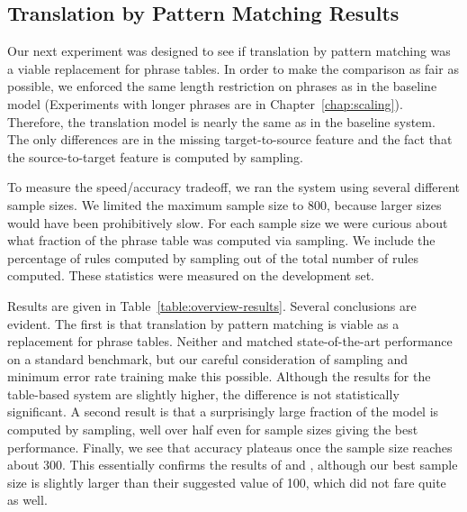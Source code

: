 \subsection{Translation by Pattern Matching Results}

Our next experiment was designed to see if translation by 
pattern matching was a viable replacement for
phrase tables.  In order to make the comparison as fair as
possible, we enforced the same length restriction on phrases
as in the baseline model (Experiments with longer phrases
are in Chapter~\ref{chap:scaling}).  Therefore, the translation
model is nearly the same as in the baseline system.  The only
differences are in the missing target-to-source feature and
the fact that the source-to-target feature is computed by
sampling.

To measure the speed/accuracy tradeoff, we ran the system using
several different sample sizes.  We limited the maximum sample 
size to 800, because larger sizes would have been prohibitively
slow.  For each sample size we were curious
about what fraction of the phrase table was computed
via sampling.  We include the percentage of rules computed by
sampling out of the total number of rules computed.  
These statistics were measured on the development set.

Results are given in Table~\ref{table:overview-results}.  Several 
conclusions are evident.  The first is that translation by pattern 
matching is viable as a replacement for phrase tables. 
Neither \citet{Callison-Burch:2005:acl} and \citet{Zhang:2005:eamt}
matched state-of-the-art performance on a standard benchmark, but our
careful consideration of sampling and minimum error rate training make this possible.
Although the results for the table-based system are slightly higher,
the difference is not statistically significant.  A second result
is that a surprisingly large fraction of the model is computed
by sampling, well over half even for sample sizes giving the best
performance.  Finally, we see that accuracy plateaus once
the sample size reaches about 300.  This essentially confirms the
results of \citet{Callison-Burch:2005:acl} and \citet{Zhang:2005:eamt},
although our best sample size is slightly larger than their
suggested value of 100, which did not fare quite as well.

